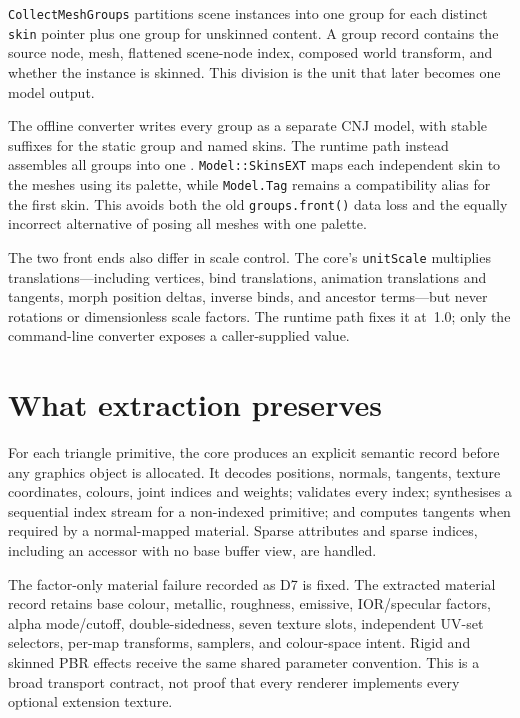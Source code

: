 \texttt{CollectMeshGroups} partitions scene instances into one group for each distinct
\texttt{skin} pointer plus one group for unskinned content. A group record contains the source
node, mesh, flattened scene-node index, composed world transform, and whether the instance is
skinned. This division is the unit that later becomes one model output.

The offline converter writes every group as a separate CNJ model, with stable suffixes for the
static group and named skins. The runtime path instead assembles all groups into one
. \texttt{Model::SkinsEXT} maps each independent skin to the meshes using its
palette, while \texttt{Model.Tag} remains a compatibility alias for the first skin. This avoids
both the old \texttt{groups.front()} data loss and the equally incorrect alternative of posing all
meshes with one palette.

The two front ends also differ in scale control. The core's \texttt{unitScale} multiplies
translations---including vertices, bind translations, animation translations and tangents,
morph position deltas, inverse binds, and ancestor terms---but never rotations or dimensionless
scale factors. The runtime path fixes it at~1.0; only the command-line converter exposes a
caller-supplied value.

\section{What extraction preserves}

For each triangle primitive, the core produces an explicit semantic record before any graphics
object is allocated. It decodes positions, normals, tangents, texture coordinates, colours,
joint indices and weights; validates every index; synthesises a sequential index stream for a
non-indexed primitive; and computes tangents when required by a normal-mapped material. Sparse
attributes and sparse indices, including an accessor with no base buffer view, are handled.

The factor-only material failure recorded as D7 is fixed. The extracted material record retains
base colour, metallic, roughness, emissive, IOR/specular factors, alpha mode/cutoff,
double-sidedness, seven texture slots, independent UV-set selectors, per-map transforms,
samplers, and colour-space intent. Rigid and skinned PBR effects receive the same shared parameter
convention. This is a broad transport contract, not proof that every renderer implements every
optional extension texture.

